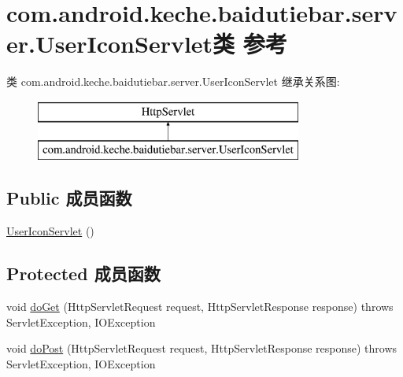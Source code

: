 \hypertarget{classcom_1_1android_1_1keche_1_1baidutiebar_1_1server_1_1_user_icon_servlet}{}\section{com.\+android.\+keche.\+baidutiebar.\+server.\+User\+Icon\+Servlet类 参考}
\label{classcom_1_1android_1_1keche_1_1baidutiebar_1_1server_1_1_user_icon_servlet}
类 com.\+android.\+keche.\+baidutiebar.\+server.\+User\+Icon\+Servlet 继承关系图\+:\begin{figure}[H]
\begin{center}
\leavevmode
\includegraphics[height=2.000000cm]{classcom_1_1android_1_1keche_1_1baidutiebar_1_1server_1_1_user_icon_servlet}
\end{center}
\end{figure}
\subsection*{Public 成员函数}
\begin{DoxyCompactItemize}
\item 
\mbox{\hyperlink{classcom_1_1android_1_1keche_1_1baidutiebar_1_1server_1_1_user_icon_servlet_aca4f4626a8e20be6168698449bd89c0c}{User\+Icon\+Servlet}} ()
\end{DoxyCompactItemize}
\subsection*{Protected 成员函数}
\begin{DoxyCompactItemize}
\item 
void \mbox{\hyperlink{classcom_1_1android_1_1keche_1_1baidutiebar_1_1server_1_1_user_icon_servlet_a920f6cc5672eeb21bf765fce8b7396aa}{do\+Get}} (Http\+Servlet\+Request request, Http\+Servlet\+Response response)  throws Servlet\+Exception, I\+O\+Exception 
\item 
void \mbox{\hyperlink{classcom_1_1android_1_1keche_1_1baidutiebar_1_1server_1_1_user_icon_servlet_abceadf7e5eb5fde6a29a142e59f21616}{do\+Post}} (Http\+Servlet\+Request request, Http\+Servlet\+Response response)  throws Servlet\+Exception, I\+O\+Exception 
\end{DoxyCompactItemize}


